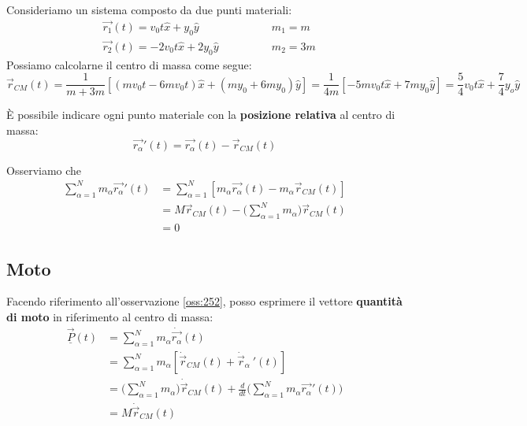 \begin{example}
	Consideriamo un sistema composto da due punti materiali:
	\begin{align*}
		& \vec{r_1}(t) = v_0 t \widehat{x}+y_0\widehat{y} \qquad\qquad & m_1 = m\\
		& \vec{r_2}(t) = -2v_0t\widehat{x} + 2y_0\widehat{y} \qquad\qquad & m_2 = 3m
	\end{align*}
	Possiamo calcolarne il centro di massa come segue:
	\begin{equation*}
		\vec{r}_{CM}(t) = \frac{1}{m+3m}[(mv_0t-6mv_0t)\widehat{x}+(my_0+6my_0)\widehat{y}] = \frac{1}{4m}[-5mv_0t\widehat{x}+7my_0\widehat{y}] = \frac{5}{4}v_0t\widehat{x}+\frac{7}{4}y_o\widehat{y}
	\end{equation*}
\end{example}

È possibile indicare ogni punto materiale con la \textbf{posizione relativa} al centro di massa:
\begin{equation}
	\label{eq:posrel}
	\vec{r_\alpha}'(t) = \vec{r_\alpha}(t) -\vec{r}_{CM}(t)
\end{equation}

\begin{observation}
	\label{oss:252}
	Osserviamo che
	\begin{equation}
		\begin{split}
			\sum_{\alpha=1}^Nm_\alpha \vec{r_\alpha}'(t) & = \sum_{\alpha=1}^N[m_\alpha\vec{r_\alpha}(t) - m_\alpha\vec{r}_{CM}(t)]\\
			& = M\vec{r}_{CM}(t) - \bigg(\sum_{\alpha=1}^N m_\alpha\bigg)\vec{r}_{CM}(t)\\
			& = 0
		\end{split}
	\end{equation}
\end{observation}

\subsection{Moto}
Facendo riferimento all'osservazione \ref{oss:252}, posso esprimere il vettore \textbf{quantità di moto} in riferimento al centro di massa:
\begin{equation}
	\label{eq:motocm}
	\begin{split}
		\underline{\vec{P}}(t) & = \sum_{\alpha=1}^N m_\alpha \dot{\vec{r_\alpha}}(t) \\
		& = \sum_{\alpha=1}^N m_\alpha [\dot{\vec{r}}_{CM}(t) + \dot{\vec{r}}_\alpha \:'(t)] \\
		& = \bigg(\sum_{\alpha=1}^N m_\alpha\bigg)\dot{\vec{r}}_{CM}(t) + \frac{d}{dt}\bigg(\sum_{\alpha=1}^N m_\alpha \vec{r_\alpha}'(t)\bigg) \\
		& = M \dot{\vec{r}}_{CM}(t)
	\end{split}
\end{equation}

